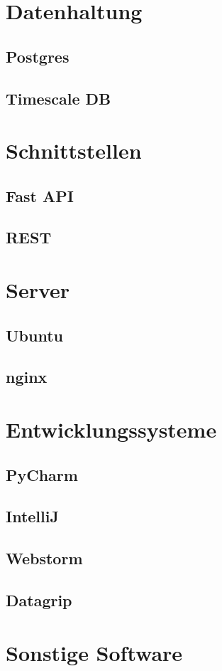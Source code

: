 \documentclass[pdftex,11pt,a4paper]{book}
\begin{document}
\section{Datenhaltung}
\subsection{Postgres}
\subsection{Timescale DB}
\section{Schnittstellen}
\subsection{Fast API}
\subsection{REST}
\section{Server}
\subsection{Ubuntu}
\subsection{nginx}

\section{Entwicklungssysteme}
\subsection{PyCharm}
\subsection{IntelliJ}
\subsection{Webstorm}
\subsection{Datagrip}
\section{Sonstige Software}
\end{document}
